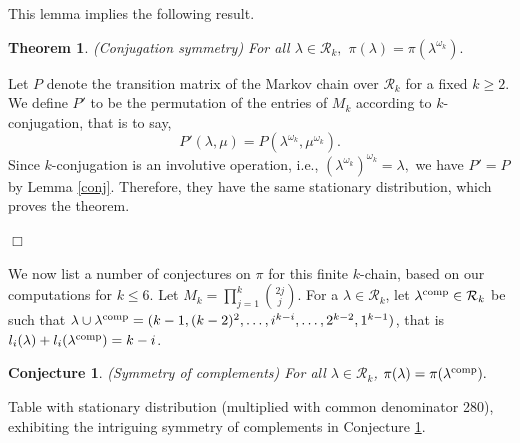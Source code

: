 \documentclass[11pt]{amsart}
\newtheorem{theorem}{Theorem}[section]
\newtheorem{conjecture}{Conjecture}[]
\newcommand{\bbox}{\hfill $\Box$}
\newcommand{\pf}{\noindent {\it Proof:} }
\newcommand{\tn}[1]{\textnormal{#1}}
\begin{document}
 This lemma implies the following result.
\begin{theorem} \tn{(Conjugation symmetry)}
    For all $\lambda \in \mathcal{R}_k,$ $\pi(\lambda)=\pi(\lambda^{\omega_k}).$
\end{theorem}
\pf Let $P$ denote the transition matrix of the Markov chain over $\mathcal{R}_k$ for a fixed $k\geq 2.$ We define $P'$ to be the permutation of the entries of $M_k$ according to $k$-conjugation, that is to say,
\[P'(\lambda,\mu)=P(\lambda^{\omega_k}, \mu^{\omega_k}).\]
Since $k$-conjugation is an involutive operation, i.e., $\left(\lambda^{\omega_k}\right)^{\omega_k}=\lambda,$ we have $P'=P$ by Lemma \ref{conj}. Therefore, they have the same stationary distribution, which proves the theorem. 

\bbox

 
We now list a number of conjectures on $\pi$ for this finite $k$-chain, based on our computations for $k\le 6$. Let $M_k=\prod_{j=1}^k\binom{2j}{j}$.
For a $\lambda\in\mathcal{R}_k$, let $\lambda^{\textnormal{comp}}\in\mathcal{R}_k$ be such that 
$\lambda \cup \lambda^{\textnormal{comp}} = (k-1,(k-2)^2,\ldots,i^{k-i},\ldots,2^{k-2},1^{k-1})$, that is $l_i(\lambda)+l_i(\lambda^{\textnormal{comp}})=k-i$.
 \begin{conjecture} \label{conj:complement}\textnormal{(Symmetry of complements)}
   For all $\lambda\in\mathcal{R}_k$, $\pi(\lambda)=\pi(\lambda^{\textnormal{comp}}).$
\end{conjecture}



Table with stationary distribution (multiplied with common denominator 280), exhibiting the intriguing symmetry of complements in Conjecture \ref{conj:complement}.
\begin{center}
\end{center}
\end{document}
